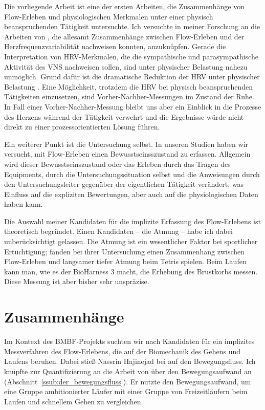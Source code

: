 Die vorliegende Arbeit ist eine der ersten Arbeiten, die Zusammenhänge von Flow-Erleben und physiologischen Merkmalen unter einer physisch beanspruchenden Tätigkeit untersuchte. Ich versuchte in meiner Forschung an die Arbeiten von \citet{deManzano2010, Keller2011, Gaggioli2013, Peifer2014, Tozman2015, Harmat2015}, die allesamt Zusammenhänge zwischen Flow-Erleben und der Herzfrequenzvariabilität nachweisen konnten, anzuknüpfen. Gerade die Interpretation von \ac{HRV}-Merkmalen, die die sympathische und parasympathische Aktivität des \ac{VNS} nachweisen sollen, sind unter physischer Belastung nahezu unmöglich. Grund dafür ist die dramatische Reduktion der \ac{HRV} unter physischer Belastung \citep{Hoos2010}. Eine Möglichkeit, trotzdem die \ac{HRV} bei physisch beanspruchenden Tätigkeiten einzusetzen, sind Vorher-Nachher-Messungen im Zustand der Ruhe. In Fall einer Vorher-Nachher-Messung bleibt uns aber ein Einblick in die Prozesse des Herzens während der Tätigkeit verwehrt und die Ergebnisse würde nicht direkt zu einer prozessorientierten Lösung führen. 

Ein weiterer Punkt ist die Untersuchung selbst. In unseren Studien haben wir versucht, mit Flow-Erleben einen Bewusstseinsszustand zu erfassen. Allgemein wird dieser Bewusstseinszustand oder das Erleben durch das Tragen des Equipments, durch die Untersuchungssituation selbst und die Anweisungen durch den Untersuchungsleiter gegenüber der eigentlichen Tätigkeit verändert, was Einfluss auf die expliziten Bewertungen, aber auch auf die physiologischen Daten haben kann.

Die Auswahl meiner Kandidaten für die implizite Erfassung des Flow-Erlebens ist theoretisch begründet. Einen Kandidaten -- die Atmung -- habe ich dabei unberücksichtigt gelassen. Die Atmung ist ein wesentlicher Faktor bei sportlicher Ertüchtigung; \citet{Harmat2015} fanden bei ihrer Untersuchung einen Zusammenhang zwischen Flow-Erleben und langsamer tiefer Atmung beim Tetris spielen. Beim Laufen kann man, wie es der BioHarness 3 macht, die Erhebung des Brustkorbs messen. Diese Messung ist aber bisher sehr unspräzise. 

\section{Zusammenhänge} 

\label{sec:zusammenhange}

Im Kontext des \acs{BMBF}-Projekts suchten wir nach Kandidaten für ein implizites Messverfahren des Flow-Erlebens, die auf der Biomechanik des Gehens und Laufens beruhen. Dabei stieß Nassrin Hajinejad bei \citet[][S.~121]{Meinel2007} auf den Bewegungsfluss.  Ich knüpfte zur Quantifizierung an die Arbeit von \citet{Hreljac2000} über den Bewegungsaufwand an (Abschnitt~\ref{ssub:der_bewegungsfluss}). Er nutzte den Bewegungsaufwand, um eine Gruppe ambitionierter Läufer mit einer Gruppe von Freizeitläufern beim Laufen und schnellem Gehen zu vergleichen. 

